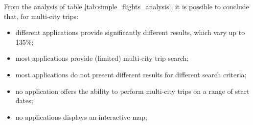 From the analysis of table \ref{tab:simple_flights_analysis}, it is possible to conclude that, for multi-city trips:

\begin{itemize}
  \item different applications provide significantly different results, which vary up to 135\%;
  \item most applications provide (limited) multi-city trip search; 
  \item most applications do not present different results for different search criteria;
  \item no application offers the ability to perform multi-city trips on a range of start dates; 
  \item no applications displays an interactive map;
\end{itemize}